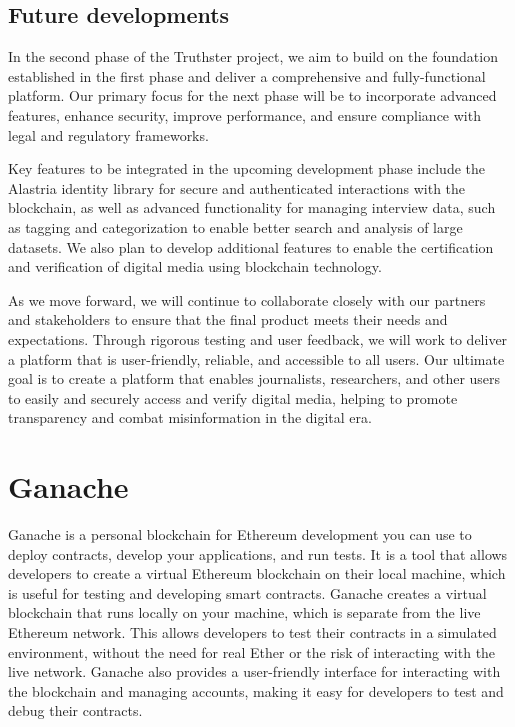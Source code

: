 \documentclass[target=mst,aauheader=]{thud}
\begin{document}
\section{Future developments}

In the second phase of the Truthster project, we aim to build on the foundation established in the first phase and deliver a comprehensive and fully-functional platform. Our primary focus for the next phase will be to incorporate advanced features, enhance security, improve performance, and ensure compliance with legal and regulatory frameworks.\par
Key features to be integrated in the upcoming development phase include the Alastria identity library for secure and authenticated interactions with the blockchain, as well as advanced functionality for managing interview data, such as tagging and categorization to enable better search and analysis of large datasets. We also plan to develop additional features to enable the certification and verification of digital media using blockchain technology.\par
As we move forward, we will continue to collaborate closely with our partners and stakeholders to ensure that the final product meets their needs and expectations. Through rigorous testing and user feedback, we will work to deliver a platform that is user-friendly, reliable, and accessible to all users. Our ultimate goal is to create a platform that enables journalists, researchers, and other users to easily and securely access and verify digital media, helping to promote transparency and combat misinformation in the digital era.
\appendix


\chapter{Ganache}
\label{appendixGanache}
Ganache is a personal blockchain for Ethereum development you can use to deploy contracts, develop your applications, and run tests. It is a tool that allows developers to create a virtual Ethereum blockchain on their local machine, which is useful for testing and developing smart contracts. Ganache creates a virtual blockchain that runs locally on your machine, which is separate from the live Ethereum network. This allows developers to test their contracts in a simulated environment, without the need for real Ether or the risk of interacting with the live network. Ganache also provides a user-friendly interface for interacting with the blockchain and managing accounts, making it easy for developers to test and debug their contracts.\par
\end{document}
